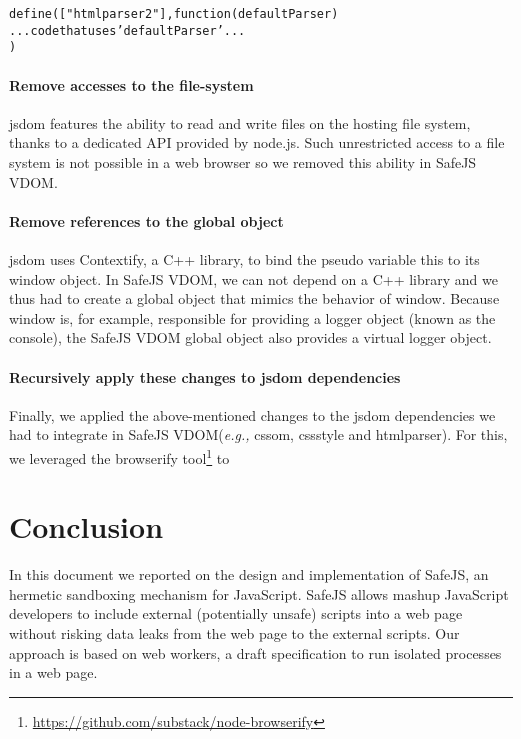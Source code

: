 \documentclass{article}
\newcommand{\eg}{\emph{e.g.,}\xspace}
\newenvironment{code}
    {\begin{alltt}\sffamily}
    {\end{alltt}\normalsize}
\newcommand{\window}{\textsf{window}\xspace}
\newcommand{\this}{\textsf{this}\xspace}
\newcommand{\js}{JavaScript\xspace}
\newcommand{\safejs}{SafeJS\xspace}
\newcommand{\vdom}{\safejs VDOM\xspace}
\newcommand{\jsdom}{jsdom\xspace}
\newcommand{\contextify}{Contextify\xspace}
\newcommand{\nodejs}{node.js\xspace}
\begin{document}
\begin{code}{}
define(["htmlparser2"], function(defaultParser) {
  ... code that uses 'defaultParser'...
})
\end{code}

\paragraph{Remove accesses to the file-system}

\jsdom features the ability to read and write files on the hosting
file system, thanks to a dedicated API provided by \nodejs. Such
unrestricted access to a file system is not possible in a web browser
so we removed this ability in \vdom.

\paragraph{Remove references to the global object}

\jsdom uses \contextify, a C++ library, to bind the pseudo variable
\this to its \window object. In \vdom, we can not depend on a C++
library and we thus had to create a global object that mimics the
behavior of \window. Because \window is, for example, responsible for
providing a logger object (known as the console), the \vdom global
object also provides a virtual logger object.

\paragraph{Recursively apply these changes to \jsdom dependencies}

Finally, we applied the above-mentioned changes to the \jsdom
dependencies we had to integrate in \vdom (\eg cssom, cssstyle and
htmlparser). For this, we leveraged the browserify
tool\footnote{\url{https://github.com/substack/node-browserify}} to

\section{Conclusion}

In this document we reported on the design and implementation of
\safejs, an hermetic sandboxing mechanism for \js. \safejs allows
mashup \js developers to include external (potentially unsafe) scripts
into a web page without risking data leaks from the web page to the
external scripts. Our approach is based on web workers, a draft
specification to run isolated processes in a web page.
\end{document}
